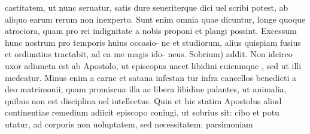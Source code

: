 \documentclass{article}
\begin{document}
\begin{pages}
castitatem, ut nunc seruatur, satis dure seueriterque dici uel scribi potest, ab aliquo earum rerum non inexperto. Sunt enim omnia quae dicuntur, longe quoque atrociora, quam pro rei indignitate a nobis proponi et plangi possint. Excessum hunc nostrum pro temporis huius occasio- ne et studiorum, alius quispiam fusius et ordinatius tractabit, ad ea me magis ido- neus. Sobrium) addit. Non idcirco uxor adiuncta est ab Apostolo, ut episcopus uacet libidini cuicumque , sed ut illi medeatur. Minus enim a carne et satana infestan tur infra cancellos benedicti a deo matrimonii, quam promiscua illa ac libera libidine palantes, ut animalia, quibus non est disciplina uel intellectus. Quin et hic statim Apostolus aliud continentiae remedium adiicit episcopo coniugi, ut sobrius sit: cibo et potu utatur, ad corporis non uoluptatem, sed necessitatem: parsimoniam  \pend

\end{pages}
\end{document}

